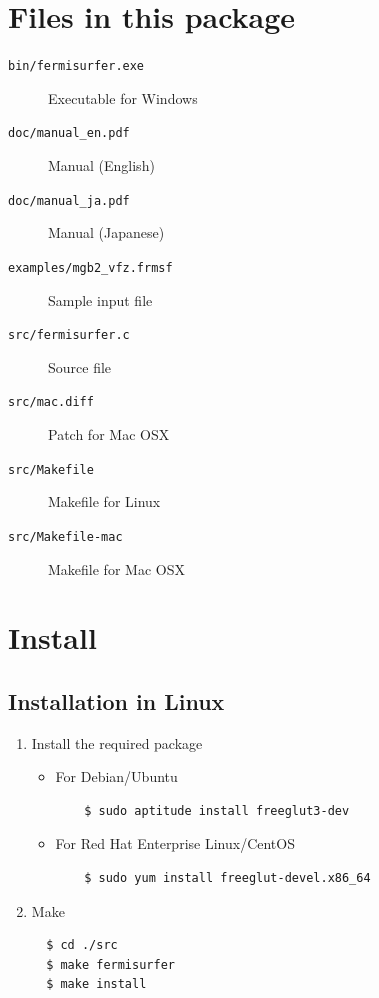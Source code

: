 \documentclass[12pt]{article}
\begin{document}
\section{Files in this package}

\begin{description}
\item[\texttt{bin/fermisurfer.exe}] Executable for Windows
\item[\texttt{doc/manual\_en.pdf}] Manual (English)
\item[\texttt{doc/manual\_ja.pdf}] Manual (Japanese)
\item[\texttt{examples/mgb2\_vfz.frmsf}] Sample input file
\item[\texttt{src/fermisurfer.c}] Source file
\item[\texttt{src/mac.diff}] Patch for Mac OSX
\item[\texttt{src/Makefile}] Makefile for Linux
\item[\texttt{src/Makefile-mac}] Makefile for Mac OSX
\end{description}

\section{Install}

\subsection{Installation in Linux}

\begin{enumerate}

\item Install the required package

  \begin{itemize}
  \item For Debian/Ubuntu
    \begin{verbatim}
    $ sudo aptitude install freeglut3-dev
    \end{verbatim}
  \item For Red Hat Enterprise Linux/CentOS
    \begin{verbatim}
    $ sudo yum install freeglut-devel.x86_64
    \end{verbatim}
  \end{itemize}

\item Make

\begin{verbatim}
  $ cd ./src
  $ make fermisurfer
  $ make install
\end{verbatim}

\end{enumerate}
\end{document}

